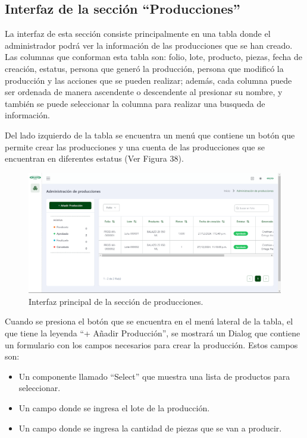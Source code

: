 \subsection{Interfaz de la sección ``Producciones''}
La interfaz de esta sección consiste principalmente en una tabla donde el administrador podrá ver la información de las producciones que se han creado. Las columnas que conforman esta tabla son: folio, lote, producto, piezas, fecha de creación, estatus, persona que generó la producción, persona que modificó la producción y las acciones que se pueden realizar; además, cada columna puede ser ordenada de manera ascendente o descendente al presionar su nombre, y también se puede seleccionar la columna para realizar una busqueda de información.

Del lado izquierdo de la tabla se encuentra un menú que contiene un botón que permite crear las producciones y una cuenta de las producciones que se encuentran en diferentes estatus (Ver Figura 38).

    \begin{figure}[H]
        \begin{center}
            \includegraphics[scale=0.33]{img/actividades/producciones/interfaz-producciones.png}
            \caption{Interfaz principal de la sección de producciones.}
            \label{fig:interfaz-producciones}
        \end{center}
    \end{figure}

Cuando se presiona el botón que se encuentra en el menú lateral de la tabla, el que tiene la leyenda ``+ Añadir Producción'', se mostrará un Dialog que contiene un formulario con los campos necesarios para crear la producción. Estos campos son:
    \begin{itemize}
        \item Un componente llamado ``Select'' que muestra una lista de productos para seleccionar.
        \item Un campo donde se ingresa el lote de la producción.
        \item Un campo donde se ingresa la cantidad de piezas que se van a producir.
    \end{itemize}

